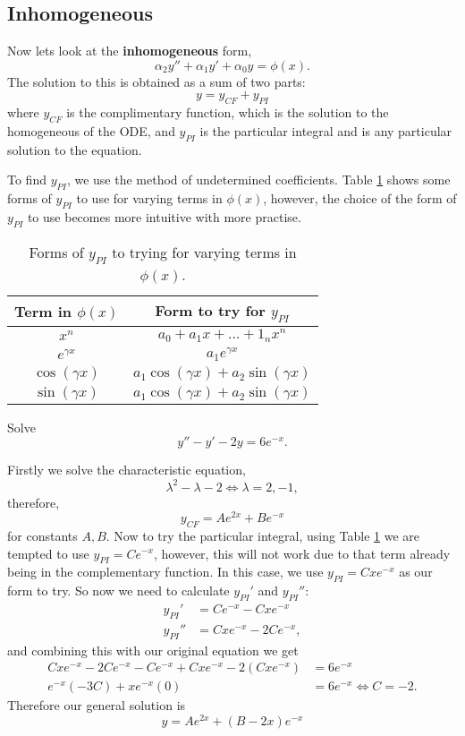 \subsection{Inhomogeneous}

Now lets look at the \textbf{inhomogeneous} form, \[\alpha_2y''+\alpha_1y'+\alpha_0y=\phi(x).\] The solution to this is obtained as a sum of two parts: \[y=y_{CF}+y_{PI}\] where $y_{CF}$ is the complimentary function, which is the solution to the homogeneous of the ODE, and $y_{PI}$ is the particular integral and is any particular solution to the equation.

To find $y_{PI}$, we use the method of undetermined coefficients. Table \ref{tab:undetermined_coefficients} shows some forms of $y_{PI}$ to use for varying terms in $\phi(x)$, however, the choice of the form of $y_{PI}$ to use becomes more intuitive with more practise.

\begin{table}
    \centering
    \begin{tabular}{cc}
        \toprule
        Term in $\phi(x)$ & Form to try for $y_{PI}$ \\
        \midrule
        $x^n$ & $a_0+a_1x+\ldots+1_n x^n$ \\
        $e^{\gamma x}$ & $a_1e^{\gamma x}$ \\
        $\cos{(\gamma x)}$ & $a_1\cos{(\gamma x)}+a_2\sin{(\gamma x)}$ \\
        $\sin{(\gamma x)}$ & $a_1\cos{(\gamma x)}+a_2\sin{(\gamma x)}$ \\
        \bottomrule
    \end{tabular}
    \caption{Forms of $y_{PI}$ to trying for varying terms in $\phi(x)$.}
    \label{tab:undetermined_coefficients}
\end{table}

\begin{example}\label{exa:dodgy_PI}
    Solve \[y''-y'-2y=6e^{-x}.\]
    
    Firstly we solve the characteristic equation, \[\lambda^2-\lambda-2\iff\lambda=2,-1,\] therefore, \[y_{CF}=Ae^{2x}+Be^{-x}\] for constants $A,B$. Now to try the particular integral, using Table \ref{tab:undetermined_coefficients} we are tempted to use $y_{PI}=Ce^{-x}$, however, this will not work due to that term already being in the complementary function. In this case, we use $y_{PI}=Cxe^{-x}$ as our form to try. So now we need to calculate $y_{PI}'$ and $y_{PI}''$:
    \begin{align*}
        y_{PI}'&=Ce^{-x}-Cxe^{-x}\\
        y_{PI}''&=Cxe^{-x}-2Ce^{-x},
    \end{align*}
    and combining this with our original equation we get
    \begin{align*}
        Cxe^{-x}-2Ce^{-x}-Ce^{-x}+Cxe^{-x}-2(Cxe^{-x})&=6e^{-x}\\
        e^{-x}(-3C)+xe^{-x}(0)&=6e^{-x}\iff C=-2.
    \end{align*}
    Therefore our general solution is \[y=Ae^{2x}+(B-2x)e^{-x}\]
\end{example}

